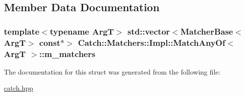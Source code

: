 \subsection{Member Data Documentation}
\hypertarget{struct_catch_1_1_matchers_1_1_impl_1_1_match_any_of_a1fb1119e6110dc15b8d5262ec0aeddd5}{
\subsubsection[{m\-\_\-matchers}]{\setlength{\rightskip}{0pt plus 5cm}template$<$typename Arg\-T$>$ std\-::vector$<${\bf Matcher\-Base}$<$Arg\-T$>$ const$\ast$$>$ {\bf Catch\-::\-Matchers\-::\-Impl\-::\-Match\-Any\-Of}$<$ Arg\-T $>$\-::m\-\_\-matchers}}\label{struct_catch_1_1_matchers_1_1_impl_1_1_match_any_of_a1fb1119e6110dc15b8d5262ec0aeddd5}


The documentation for this struct was generated from the following file\-:\begin{DoxyCompactItemize}
\item 
\hyperlink{catch_8hpp}{catch.\-hpp}\end{DoxyCompactItemize}
